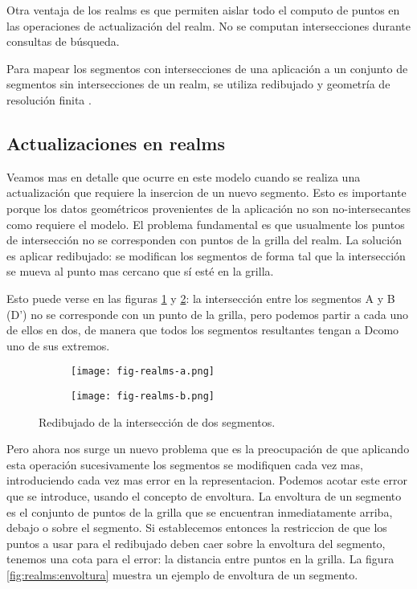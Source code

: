 Otra ventaja de los realms es que permiten aislar todo el computo de puntos en las operaciones de actualización del realm.
No se computan intersecciones durante consultas de búsqueda.

Para mapear los segmentos con intersecciones de una aplicación a un conjunto de segmentos sin intersecciones de un realm,
se utiliza redibujado y geometría de resolución finita \cite{finite:resolution}.

\subsection{Actualizaciones en realms} \label{realms:2}

Veamos mas en detalle que ocurre en este modelo cuando se realiza una actualización que requiere la insercion de un nuevo segmento.
Esto es importante porque los datos geométricos provenientes de la aplicación no son no-intersecantes como requiere el modelo.
El problema fundamental es que usualmente los puntos de intersección no se corresponden con puntos de la grilla del realm.
La solución es aplicar redibujado:
se modifican los segmentos de forma tal que la intersección se mueva al punto mas cercano que sí esté en la grilla.

Esto puede verse en las figuras \ref{fig:realms:redibu:a} y \ref{fig:realms:redibu:b}:
la intersección entre los segmentos A y B (D') no se corresponde con un punto de la grilla,
pero podemos partir a cada uno de ellos en dos, de manera que todos los segmentos resultantes tengan a Dcomo uno de sus extremos.

\begin{figure}
    \centering
    \begin{subfigure}[b]{0.3\textwidth}
        \texttt{[image: fig-realms-a.png]}
        \caption{}
        \label{fig:realms:redibu:a}
    \end{subfigure}
    \begin{subfigure}[b]{0.3\textwidth}
        \texttt{[image: fig-realms-b.png]}
        \caption{}
        \label{fig:realms:redibu:b}
    \end{subfigure}
    \caption{Redibujado de la intersección de dos segmentos.}
    \label{fig:realms:redibu}
\end{figure}

Pero ahora nos surge un nuevo problema que es la preocupación de que aplicando esta operación sucesivamente
los segmentos se modifiquen cada vez mas, introduciendo cada vez mas error en la representacion.
Podemos acotar este error que se introduce, usando el concepto de envoltura.
La envoltura de un segmento es el conjunto de puntos de la grilla que se encuentran inmediatamente arriba, debajo o sobre el segmento.
Si establecemos entonces la restriccion de que los puntos a usar para el redibujado deben caer sobre la envoltura del segmento,
tenemos una cota para el error: la distancia entre puntos en la grilla.
La figura \ref{fig:realms:envoltura} muestra un ejemplo de envoltura de un segmento.

